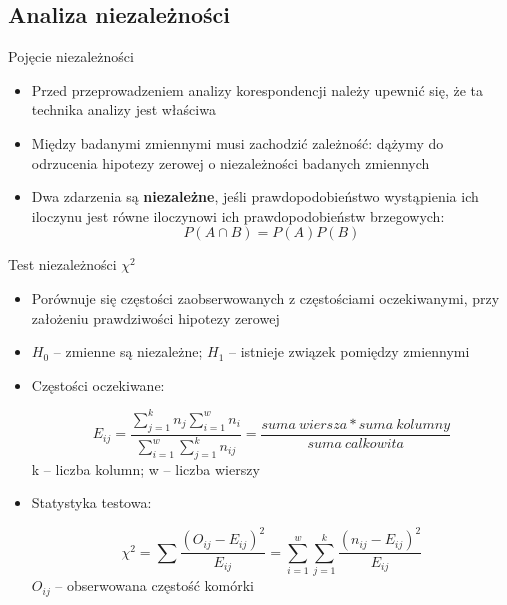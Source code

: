 \documentclass{beamer}
\begin{document}
\subsection{Analiza niezależności}
\begin{frame}{Pojęcie niezależności}
  \begin{itemize}
  \item Przed przeprowadzeniem analizy korespondencji należy upewnić się, że ta technika analizy jest właściwa
  \item Między badanymi zmiennymi musi zachodzić zależność: dążymy do odrzucenia hipotezy zerowej o niezależności badanych zmiennych
  \item Dwa zdarzenia są \textbf{niezależne}, jeśli prawdopodobieństwo wystąpienia ich iloczynu jest równe iloczynowi ich prawdopodobieństw brzegowych:
    $$ P(A \cap B) = P(A)P(B) $$
  \end{itemize}
\end{frame}

\begin{frame}{Test niezależności $\chi^2$}
  \begin{itemize}
  \item Porównuje się częstości zaobserwowanych z częstościami oczekiwanymi, przy założeniu prawdziwości hipotezy zerowej
  \item \textbf{$H_0$} -- zmienne są niezależne; \textbf{$H_1$} -- istnieje związek pomiędzy zmiennymi
  \item Częstości oczekiwane:
    \begin{scriptsize}
    $$E_{ij} = \frac{\sum_{j=1}^{k} n_{j} \sum_{i=1}^{w}n_{i}}{\sum_{i=1}^{w}\sum_{j=1}^k n_{ij}} = \frac{suma\ wiersza * suma\ kolumny}{suma\ calkowita} $$
      k -- liczba kolumn; w -- liczba wierszy
    \end{scriptsize}
  \item Statystyka testowa:
   \begin{scriptsize}
    $$\chi^2 = \sum \frac{(O_{ij}-E_{ij})^2}{E_{ij}} = \sum_{i=1}^{w}\sum_{j=1}^{k} \frac{(n_{ij}-E_{ij})^2}{E_{ij}}$$
     $O_{ij}$ -- obserwowana częstość komórki
    \end{scriptsize}
  \end{itemize}
\end{frame}
\end{document}
